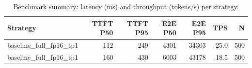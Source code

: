 \begin{table}
\caption{Benchmark summary: latency (ms) and throughput (tokens/s) per strategy.}
\label{tab:summary}
\begin{tabular}{lrrrrrr}
\toprule
Strategy & TTFT P50 & TTFT P95 & E2E P50 & E2E P95 & TPS & N \\
\midrule
baseline_full_fp16_tp1 & 112 & 249 & 4301 & 34303 & 25.0 & 500 \\
baseline_full_fp16_tp1 & 160 & 430 & 6003 & 43178 & 18.5 & 500 \\
\bottomrule
\end{tabular}
\end{table}
